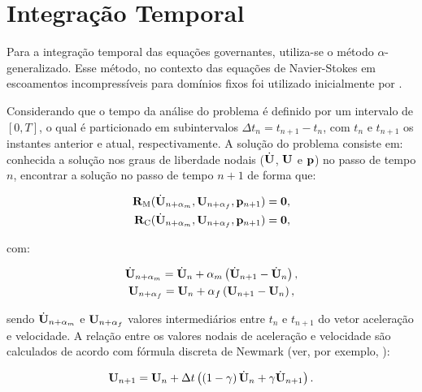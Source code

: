 \documentclass[tese_patricia]{subfiles}%
\begin{document}
\section{Integração Temporal}\label{sec:IntegTemp}

Para a integração temporal das equações governantes, utiliza-se o método $\alpha$-generalizado. Esse método, no contexto das equações de Navier-Stokes em escoamentos incompressíveis para domínios fixos foi utilizado inicialmente por .

Considerando que o tempo da análise do problema é definido por um intervalo de $[0,T]$, o qual é particionado em subintervalos $\Delta t_{n} = t_{n+1} - t_{n}$, com $t_{n}$ e $t_{n+1}$ os instantes anterior e atual, respectivamente. A solução do problema consiste em: conhecida a solução nos graus de liberdade nodais ($\dot{\mathbf{U}}$, $\mathbf{U}$ e $\mathbf{p}$) no passo de tempo $n$, encontrar a solução no passo de tempo $n+1$ de forma que:

\begin{align}
\mathbf{R}_\mathrm{M}(\dot{\mathbf{U}}_{n+\alpha_m},\mathbf{U}_{n+\alpha_f},\mathbf{p}_{n+1}) = \mathbf{0}, \label{eq:momentum_residual_alpha}\\
\mathbf{R}_\mathrm{C}(\dot{\mathbf{U}}_{n+\alpha_m},\mathbf{U}_{n+\alpha_f},\mathbf{p}_{n+1}) = \mathbf{0}, \label{eq:continuity_residual_alpha}
\end{align}

\noindent com:

\begin{gather}
\dot{\mathbf{U}}_{n+\alpha_m} = \dot{\mathbf{U}}_n + \alpha_m \left( \dot{\mathbf{U}}_{n+1} - \dot{\mathbf{U}}_n \right), \label{eq:approx_acceleration}\\
\mathbf{U}_{n+\alpha_f} = \mathbf{U}_n + \alpha_f \left( \mathbf{U}_{n+1} - \mathbf{U}_n \right), \label{eq:approx_velocity}
\end{gather}

\noindent sendo $\dot{\mathbf{U}}_{n+\alpha_m}$ e $\mathbf{U}_{n+\alpha_f}$ valores intermediários entre $t_{n}$ e $t_{n+1}$ do vetor aceleração e velocidade. A relação entre os valores nodais de aceleração e velocidade são calculados de acordo com fórmula discreta de Newmark (ver, por exemplo, \cite{Hughes:1976}):

\begin{gather}
\mathbf{U}_{n+1} = \mathbf{U}_n + \Delta t\left(\left(1-\gamma\right)\dot{\mathbf{U}}_n + \gamma\dot{\mathbf{U}}_{n+1} \right). \label{eq:newmark}
\end{gather}
\end{document}
